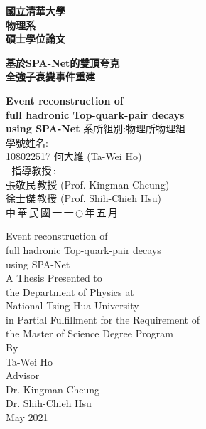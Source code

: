 \begin{titlepage}  %
\begin{center}
\Huge
\textbf{國立清華大學\\物理系\\碩士學位論文\\}
\vspace*{1.5in}
\huge
	
\textbf{基於SPA-Net的雙頂夸克\\全強子衰變事件重建}
	
\LARGE
\textbf{Event reconstruction of \\full hadronic Top-quark-pair decays\\ using SPA-Net}
\vfill
\Large 系所組別:物理所物理組\\
\Large 學號姓名: \\ 108022517 何大維 (Ta-Wei Ho)\\
\Large $\:$$\:$$\,$指導教授$\,$: \\張敬民$\,$教授 (Prof. Kingman Cheung)\\徐士傑$\,$教授 (Prof. Shih-Chieh Hsu) \\ 
\vfill
\Large 中$\,$華$\,$民$\,$國$\,$一$\,$一$\,$$\bigcirc$$\,$年$\,$五$\,$月
\end{center}
\end{titlepage}

\begin{titlepage} %
\begin{center}
\huge {Event reconstruction of\\full hadronic Top-quark-pair decays\\ using SPA-Net\\}
\vspace*{1.5in}
\large A Thesis Presented to \\the Department of Physics at \\National Tsing Hua University \\in Partial Fulfillment for the Requirement of \\the Master of Science Degree Program\\
\vspace*{2in}
\large By\\Ta-Wei Ho\\
\large Advisor\\Dr. Kingman Cheung\\ Dr. Shih-Chieh Hsu \\
\large May 2021
\end{center}
\end{titlepage}
